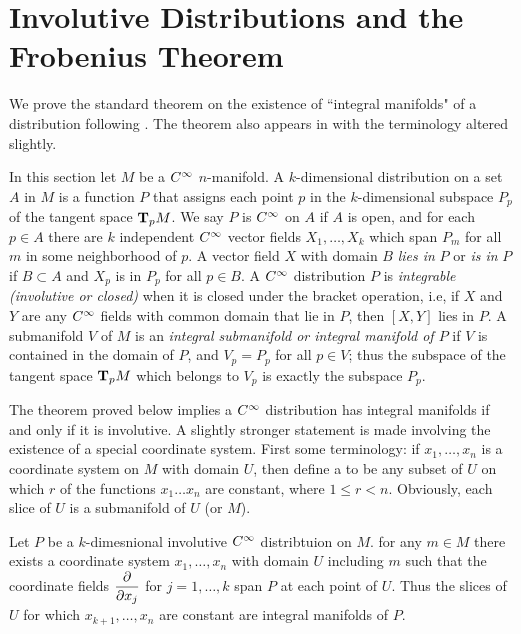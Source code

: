 \documentclass[../main]{subfiles}
\begin{document}
\section{Involutive Distributions and the Frobenius Theorem}\label{ch09:s1}
We prove the standard theorem on the existence of ``integral manifolds" of a distribution following \cite[p. 88]{chevalley1946theory}. The theorem also appears in \cite[p.~147]{auslander2012introduction} with the terminology altered slightly.

In this section let $M$ be a $\CInfty$ $n$-manifold. A $k$-dimensional distribution on a set $A$ in $M$ is a function $P$ that assigns each point $p$ in the $k$-dimensional subspace $P_p$ of the tangent space $\tangentspace{M}{p}$. We say $P$ is $\CInfty$ on $A$ if $A$ is open, and for each $p \in A$ there are $k$ independent $\CInfty$ vector fields $X_1, \dots, X_k$ which span $P_m$ for all $m$ in some neighborhood of $p$. A vector field $X$ with domain $B$ \emph{lies in} $P$ or \emph{is in} $P$ if $B \subset A$ and $X_p$ is in $P_p$ for all $p \in B$. A $\CInfty$ distribution $P$ is \emph{integrable (involutive or closed)} when it is closed under the bracket operation, i.e, if $X$ and $Y$ are any $\CInfty$ fields with common domain that lie in $P$, then $[X,Y]$ lies in $P$. A submanifold $V$ of $M$ is an \emph{integral submanifold or integral manifold of $P$} if $V$ is contained in the domain of $P$, and $V_p=P_p$ for all $p\in V$; thus the subspace of the tangent space $\tangentspace{M}{p}$ which belongs to $V_p$ is exactly the subspace $P_p$.

The theorem proved below implies a $\CInfty$ distribution has integral manifolds if and only if it is involutive. A slightly stronger statement is made involving the existence of a special coordinate system. First some terminology: if $x_1,\dots, x_n$ is a coordinate system on $M$ with domain $U$, then define a  to be any subset of $U$ on which $r$ of the functions $x_1\dots x_n$ are constant, where $1\leq r<n$. Obviously, each slice of $U$ is a submanifold of $U$ (or $M$).

\begin{theorem}\label{thm:ch09.1.1}
Let $P$ be a $k$-dimesnional involutive $\CInfty$ distribtuion on $M$. for any $m\in M$ there exists a coordinate system $x_1,\dots ,x_n$ with domain $U$ including $m$ such that the coordinate fields $\pdv{}{x_j}$ for $j=1,\dots, k$ span $P$ at each point of $U$. Thus the slices of $U$ for which $x_{k+1},\dots,x_n$ are constant are integral manifolds of $P$.
\end{theorem}
\end{document}
